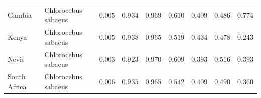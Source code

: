 \documentclass{article}
\providecommand{\DIFaddtex}[1]{{\protect\color{blue}\uwave{#1}}} %
\providecommand{\DIFdeltex}[1]{{\protect\color{red}\sout{#1}}}                      %
\providecommand{\DIFaddFL}[1]{\DIFadd{#1}} %
\providecommand{\DIFdelFL}[1]{\DIFdel{#1}} %
\providecommand{\DIFaddbeginFL}{} %
\providecommand{\DIFaddendFL}{} %
\providecommand{\DIFdelbeginFL}{} %
\providecommand{\DIFdelendFL}{} %
\providecommand{\DIFadd}[1]{\texorpdfstring{\DIFaddtex{#1}}{#1}} %
\providecommand{\DIFdel}[1]{\texorpdfstring{\DIFdeltex{#1}}{}} %
\newcommand{\DIFscaledelfig}{0.5}
\newlength{\DIFdelgraphicswidth} %
\newlength{\DIFdelgraphicsheight} %
\newcommand{\DIFaddincludegraphics}[2][]{{\color{blue}\fbox{\DIFOincludegraphics[#1]{#2}}}} %
\newcommand{\DIFdelincludegraphics}[2][]{%
\sbox{\DIFdelgraphicsbox}{\DIFOincludegraphics[#1]{#2}}%
\settoboxwidth{\DIFdelgraphicswidth}{\DIFdelgraphicsbox} %
\settoboxtotalheight{\DIFdelgraphicsheight}{\DIFdelgraphicsbox} %
\scalebox{\DIFscaledelfig}{%
\parbox[b]{\DIFdelgraphicswidth}{\usebox{\DIFdelgraphicsbox}\\[-\baselineskip] \rule{\DIFdelgraphicswidth}{0em}}\llap{\resizebox{\DIFdelgraphicswidth}{\DIFdelgraphicsheight}{%
\setlength{\unitlength}{\DIFdelgraphicswidth}%
\begin{picture}(1,1)%
\thicklines\linethickness{2pt} %
{\color[rgb]{1,0,0}\put(0,0){\framebox(1,1){}}}%
{\color[rgb]{1,0,0}\put(0,0){\line( 1,1){1}}}%
{\color[rgb]{1,0,0}\put(0,1){\line(1,-1){1}}}%
\end{picture}%
}\hspace*{3pt}}} %
} %
\DeclareRobustCommand{\DIFaddbeginFL}{\DIFOaddbeginFL \let\includegraphics\DIFaddincludegraphics} %
\DeclareRobustCommand{\DIFaddendFL}{\DIFOaddendFL \let\includegraphics\DIFOincludegraphics} %
\DeclareRobustCommand{\DIFdelbeginFL}{\DIFOdelbeginFL \let\includegraphics\DIFdelincludegraphics} %
\DeclareRobustCommand{\DIFdelendFL}{\DIFOaddendFL \let\includegraphics\DIFOincludegraphics} %
\begin{document}
\begin{table}[tb]
\begin{adjustbox}{width=\textwidth}
\begin{tabular}{||l|l|r||r|r||r|r||r|r||}
                \rowcolor{LIGHTGREY} Gambia & Chlorocebus sabaeus & \DIFdelbeginFL \DIFdelFL{$ 0.005$ }\DIFdelendFL \DIFaddbeginFL \DIFaddFL{$1.4\times 10^{5}$ }\DIFaddendFL & \DIFdelbeginFL \DIFdelFL{$ 0.934$ }\DIFdelendFL \DIFaddbeginFL \DIFaddFL{$ 0.944$ }\DIFaddendFL & \DIFdelbeginFL \DIFdelFL{$ 0.969$ }\DIFdelendFL \DIFaddbeginFL \DIFaddFL{$ 0.975$ }\DIFaddendFL & \DIFdelbeginFL \DIFdelFL{$ 0.610$ }\DIFdelendFL \DIFaddbeginFL \DIFaddFL{$ 0.654$ }\DIFaddendFL & \DIFdelbeginFL \DIFdelFL{$ 0.409$ }\DIFdelendFL \DIFaddbeginFL \DIFaddFL{$ 0.437$ }\DIFaddendFL & \DIFdelbeginFL \DIFdelFL{$ 0.486$ }\DIFdelendFL \DIFaddbeginFL \DIFaddFL{$ 0.577$ }\DIFaddendFL & \DIFdelbeginFL \DIFdelFL{$ 0.774$ }\DIFdelendFL \DIFaddbeginFL \DIFaddFL{$ 0.821$ }\DIFaddendFL \\
                \rowcolor{LIGHTGREY} Kenya & Chlorocebus sabaeus & \DIFdelbeginFL \DIFdelFL{$ 0.005$ }\DIFdelendFL \DIFaddbeginFL \DIFaddFL{$1.5\times 10^{5}$ }\DIFaddendFL & \DIFdelbeginFL \DIFdelFL{$ 0.938$ }\DIFdelendFL \DIFaddbeginFL \DIFaddFL{$ 0.946$ }\DIFaddendFL & \DIFdelbeginFL \DIFdelFL{$ 0.965$ }\DIFdelendFL \DIFaddbeginFL \DIFaddFL{$ 0.972$ }\DIFaddendFL & \DIFdelbeginFL \DIFdelFL{$ 0.519$ }\DIFdelendFL \DIFaddbeginFL \DIFaddFL{$ 0.538$ }\DIFaddendFL & \DIFdelbeginFL \DIFdelFL{$ 0.434$ }\DIFdelendFL \DIFaddbeginFL \DIFaddFL{$ 0.453$ }\DIFaddendFL & \DIFdelbeginFL \DIFdelFL{$ 0.478$ }\DIFdelendFL \DIFaddbeginFL \DIFaddFL{$ 0.588$ }\DIFaddendFL & \DIFdelbeginFL \DIFdelFL{$ 0.243$ }\DIFdelendFL \DIFaddbeginFL \DIFaddFL{$ 0.257$ }\DIFaddendFL \\
                \rowcolor{LIGHTGREY} Nevis & Chlorocebus sabaeus & \DIFdelbeginFL \DIFdelFL{$ 0.003$ }\DIFdelendFL \DIFaddbeginFL \DIFaddFL{$ 1\times 10^{5}$ }\DIFaddendFL & \DIFdelbeginFL \DIFdelFL{$ 0.923$ }\DIFdelendFL \DIFaddbeginFL \DIFaddFL{$ 0.933$ }\DIFaddendFL & \DIFdelbeginFL \DIFdelFL{$ 0.970$ }\DIFdelendFL \DIFaddbeginFL \DIFaddFL{$ 0.976$ }\DIFaddendFL & \DIFdelbeginFL \DIFdelFL{$ 0.609$ }\DIFdelendFL \DIFaddbeginFL \DIFaddFL{$ 0.629$ }\DIFaddendFL & \DIFdelbeginFL \DIFdelFL{$ 0.393$ }\DIFdelendFL \DIFaddbeginFL \DIFaddFL{$ 0.412$ }\DIFaddendFL & \DIFdelbeginFL \DIFdelFL{$ 0.516$ }\DIFdelendFL \DIFaddbeginFL \DIFaddFL{$ 0.599$ }\DIFaddendFL & \DIFdelbeginFL \DIFdelFL{$ 0.393$ }\DIFdelendFL \DIFaddbeginFL \DIFaddFL{$ 0.358$ }\DIFaddendFL \\
                \rowcolor{LIGHTGREY} South Africa & Chlorocebus sabaeus & \DIFdelbeginFL \DIFdelFL{$ 0.006$ }\DIFdelendFL \DIFaddbeginFL \DIFaddFL{$1.8\times 10^{5}$ }\DIFaddendFL & \DIFdelbeginFL \DIFdelFL{$ 0.935$ }\DIFdelendFL \DIFaddbeginFL \DIFaddFL{$ 0.944$ }\DIFaddendFL & \DIFdelbeginFL \DIFdelFL{$ 0.965$ }\DIFdelendFL \DIFaddbeginFL \DIFaddFL{$ 0.971$ }\DIFaddendFL & \DIFdelbeginFL \DIFdelFL{$ 0.542$ }\DIFdelendFL \DIFaddbeginFL \DIFaddFL{$ 0.548$ }\DIFaddendFL & \DIFdelbeginFL \DIFdelFL{$ 0.409$ }\DIFdelendFL \DIFaddbeginFL \DIFaddFL{$ 0.423$ }\DIFaddendFL & \DIFdelbeginFL \DIFdelFL{$ 0.490$ }\DIFdelendFL \DIFaddbeginFL \DIFaddFL{$ 0.574$ }\DIFaddendFL & \DIFdelbeginFL \DIFdelFL{$ 0.360$ }\DIFdelendFL \DIFaddbeginFL \DIFaddFL{$ 0.341$ }\DIFaddendFL \\

\end{tabular}
\end{adjustbox}
\end{table}
\end{document}
